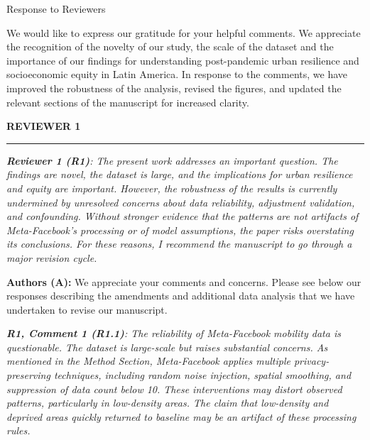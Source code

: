 \documentclass[12pt,a4paper,oneside, reqno]{amsart}
\begin{document}
\newpage

\thispagestyle{empty}


\mbox{}

\vspace{1pt}

\begin{flushright}


{\large Response to Reviewers}

\end{flushright}

\vspace{15pt}


\setlength{\leftskip}{0cm} We would like to express our gratitude for your helpful comments. We appreciate the recognition of the novelty of our study, the scale of the dataset and the importance of our findings for understanding post-pandemic urban resilience and socioeconomic equity in Latin America. In response to the comments, we have improved the robustness of the analysis, revised the figures, and updated the relevant sections of the manuscript for increased clarity. 

\vspace{10pt}

\textbf{REVIEWER 1}
\vspace{-16pt}
\begin{center}
    \rule{\textwidth}{.1pt}
\end{center}

\vspace{5pt}

\setlength{\leftskip}{0cm} \textit{\textbf{Reviewer 1 (R1)}: The present work addresses an important question. The findings are novel, the dataset is large, and the implications for urban resilience and equity are important. However, the robustness of the results is currently undermined by unresolved concerns about data reliability, adjustment validation, and confounding. Without stronger evidence that the patterns are not artifacts of Meta-Facebook’s processing or of model assumptions, the paper risks overstating its conclusions. For these reasons, I recommend the manuscript to go through a major revision cycle.}

\setlength{\leftskip}{1cm}\textbf{Authors (A):} We appreciate your comments and concerns. Please see below our responses describing the amendments and additional data analysis that we have undertaken to revise our manuscript.

\setlength{\leftskip}{0cm}\textit{\textbf{R1, Comment 1 (R1.1)}: The reliability of Meta-Facebook mobility data is questionable. The dataset is large-scale but raises substantial concerns. As mentioned in the Method Section, Meta-Facebook applies multiple privacy-preserving techniques, including random noise injection, spatial smoothing, and suppression of data count below 10. These interventions may distort observed patterns, particularly in low-density areas. The claim that low-density and deprived areas quickly returned to baseline may be an artifact of these processing rules.}
\end{document}
